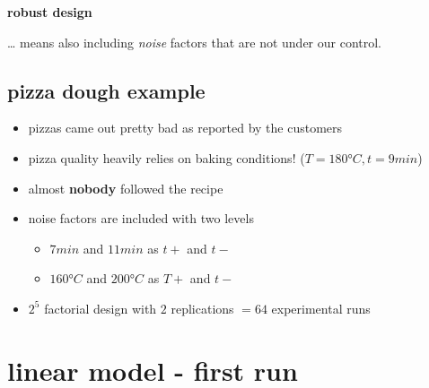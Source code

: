 \documentclass[
  a4paper,
]{scrbook}
\providecommand{\tightlist}{%
  \setlength{\itemsep}{0pt}\setlength{\parskip}{0pt}}\usepackage{longtable,booktabs,array}
\begin{document}
\textbf{robust design}

\ldots{} means also including \emph{noise} factors that are not under
our control.

\subsection{pizza dough example}\label{pizza-dough-example-1}

\begin{itemize}
\item
  pizzas came out pretty bad as reported by the customers
\item
  pizza quality heavily relies on baking conditions!
  (\(T = 180°C, t = 9min\))
\item
  almost \textbf{nobody} followed the recipe
\item
  noise factors are included with two levels

  \begin{itemize}
  \tightlist
  \item
    \(7min\) and \(11min\) as \(t+\) and \(t-\)
  \item
    \(160°C\) and \(200°C\) as \(T+\) and \(t-\)
  \end{itemize}
\item
  \(2^5\) factorial design with \(2\) replications \(=64\) experimental
  runs
\end{itemize}

\section{linear model - first run}\label{linear-model---first-run}
\end{document}

